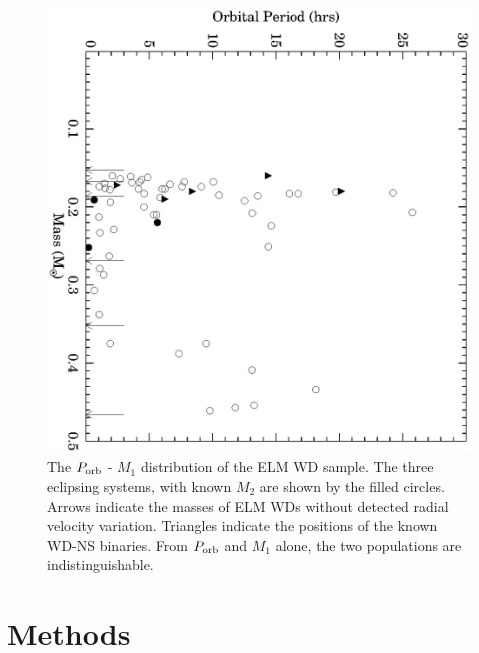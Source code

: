 \documentclass[apjl]{emulateapj}
\begin{document}
\begin{figure}[h!]
\begin{center}
\includegraphics[angle=90,width=0.95\columnwidth]{Porb_M1.eps}
\caption{The $P_{\rm orb}$ - $M_1$ distribution of the ELM WD sample. The three eclipsing systems, with known $M_2$ are shown by the filled circles. Arrows indicate the masses of ELM WDs without detected radial velocity variation. Triangles indicate the positions of the known WD-NS binaries. From $P_{\rm orb}$ and $M_1$ alone, the two populations are indistinguishable.}
\end{center}
\end{figure}

\section{Methods}
\end{document}
